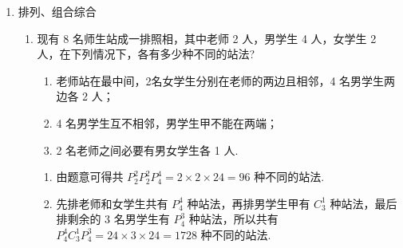\begin{enumerate}
\begin{enumerate}
\begin{jieda}
\begin{enumerate}
                \item 考虑平面$BCC'B'$的涂色情况
                综上，共有$96+144+24 = 264$种.
            \end{enumerate}
        \end{jieda}
        
    \end{enumerate}
    \item 排列、组合综合
    \begin{enumerate}
        \item 现有 8 名师生站成一排照相，其中老师 2 人，男学生 4 人，女学生 2 人，在下列情况下，各有多少种不同的站法?
        \begin{enumerate}
            \item 老师站在最中间，2名女学生分别在老师的两边且相邻，4 名男学生两边各 2 人；
            \item 4 名男学生互不相邻，男学生甲不能在两端；
            \item 2 名老师之间必要有男女学生各 1 人.
        \end{enumerate}
        \begin{jieda}
            \begin{enumerate}
                \item 由题意可得共 $P_{2}^{2}P_{2}^{2}P_{4}^{4} = 2 \times  2 \times  {24} = {96}$ 种不同的站法.
                
                \item 先排老师和女学生共有 $P_{4}^{4}$ 种站法，再排男学生甲有 ${{C}}_{3}^{1}$ 种站法，最后排剩余的 3 名男学生有 $P_{4}^{3}$ 种站法，所以共有 $P_{4}^{4}{{C}}_{3}^{1}P_{4}^{3} = {24} \times  3 \times  {24} = {1728}$ 种不同的站法.
                

\end{enumerate}
\end{jieda}
\end{enumerate}
\end{enumerate}
